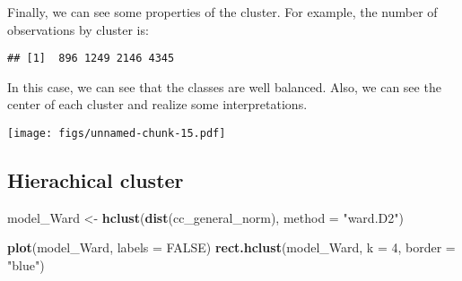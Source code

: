\documentclass[11pt,]{article}
\newenvironment{Shaded}{\begin{snugshade}}{\end{snugshade}}
\newcommand{\KeywordTok}[1]{\textcolor[rgb]{0.13,0.29,0.53}{\textbf{#1}}}
\newcommand{\DataTypeTok}[1]{\textcolor[rgb]{0.13,0.29,0.53}{#1}}
\newcommand{\DecValTok}[1]{\textcolor[rgb]{0.00,0.00,0.81}{#1}}
\newcommand{\StringTok}[1]{\textcolor[rgb]{0.31,0.60,0.02}{#1}}
\newcommand{\OtherTok}[1]{\textcolor[rgb]{0.56,0.35,0.01}{#1}}
\newcommand{\OperatorTok}[1]{\textcolor[rgb]{0.81,0.36,0.00}{\textbf{#1}}}
\newcommand{\NormalTok}[1]{#1}
\begin{document}
Finally, we can see some properties of the cluster. For example, the
number of observations by cluster is:

\begin{Shaded}
\end{Shaded}

\begin{verbatim}
## [1]  896 1249 2146 4345
\end{verbatim}

In this case, we can see that the classes are well balanced. Also, we
can see the center of each cluster and realize some interpretations.

\begin{Shaded}
\end{Shaded}

\texttt{[image: figs/unnamed-chunk-15.pdf]}

\subsection{Hierachical cluster}\label{hierachical-cluster}

\begin{Shaded}
\begin{Highlighting}[]
\NormalTok{model_Ward <-}\StringTok{ }\KeywordTok{hclust}\NormalTok{(}\KeywordTok{dist}\NormalTok{(cc_general_norm), }\DataTypeTok{method =} \StringTok{"ward.D2"}\NormalTok{)}

\KeywordTok{plot}\NormalTok{(model_Ward, }\DataTypeTok{labels =} \OtherTok{FALSE}\NormalTok{)}
\KeywordTok{rect.hclust}\NormalTok{(model_Ward, }\DataTypeTok{k =} \DecValTok{4}\NormalTok{, }\DataTypeTok{border =} \StringTok{"blue"}\NormalTok{)}
\end{Highlighting}
\end{Shaded}
\end{document}
